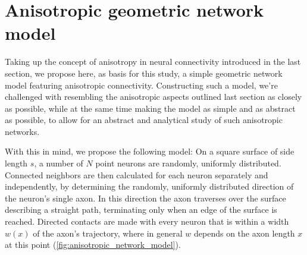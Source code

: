

\section{Anisotropic geometric network model}
\label{sec:anisotropic_network_model}

Taking up the concept of anisotropy in neural connectivity introduced
in the last section, we propose here, as basis for this study, a
simple geometric network model featuring anisotropic
connectivity. Constructing such a model, we're challenged with
resembling the anisotropic aspects outlined last section as closely as
possible, while at the same time making the model as simple and as
abstract as possible, to allow for an abstract and analytical study of
such anisotropic networks.

With this in mind, we propose the following model: On a square surface
of side length $s$, a number of $N$ point neurons are randomly,
uniformly distributed.  Connected neighbors are then calculated for
each neuron separately and independently, by determining the randomly,
uniformly distributed direction of the neuron's single axon. In this
direction the axon traverses over the surface describing a straight
path, terminating only when an edge of the surface is
reached. Directed contacts are made with every neuron that is within a
width $w(x)$ of the axon's trajectory, where in general $w$ depends on
the axon length $x$ at this point
(\autoref{fig:anisotropic_network_model}).

